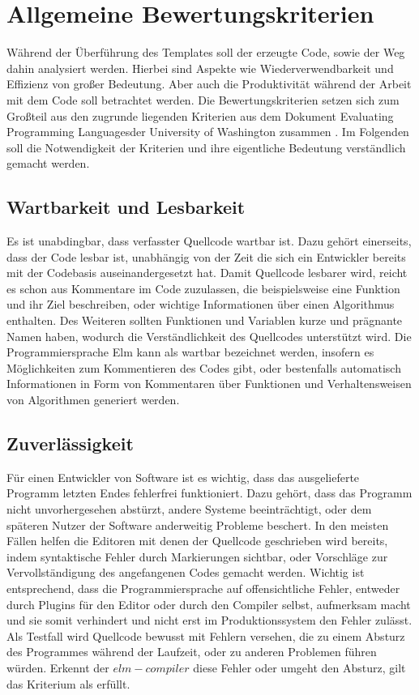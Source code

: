\section{Allgemeine Bewertungskriterien}
\label{sec:Bewertungskriterien}
Während der Überführung des Templates soll der erzeugte Code, sowie der Weg dahin analysiert werden. Hierbei sind Aspekte wie Wiederverwendbarkeit und Effizienz von großer Bedeutung. Aber auch die Produktivität während der Arbeit mit dem Code soll betrachtet werden. Die Bewertungskriterien setzen sich zum Großteil aus den zugrunde liegenden Kriterien aus dem Dokument \glqq Evaluating Programming Languages\grqq der University of Washington zusammen \cite[Vgl.]{washington-evaluation}. Im Folgenden soll die Notwendigkeit der Kriterien und ihre eigentliche Bedeutung verständlich gemacht werden.


\subsection{Wartbarkeit und Lesbarkeit}
\label{sec:muster_wartbarkeit_und_lesbarkeit}
Es ist unabdingbar, dass verfasster Quellcode wartbar ist. Dazu gehört einerseits, dass der Code lesbar ist, unabhängig von der Zeit die sich ein Entwickler bereits mit der Codebasis auseinandergesetzt hat. Damit Quellcode lesbarer wird, reicht es schon aus Kommentare im Code zuzulassen, die beispielsweise eine Funktion und ihr Ziel beschreiben, oder wichtige Informationen über einen Algorithmus enthalten. Des Weiteren sollten Funktionen und Variablen kurze und prägnante Namen haben, wodurch die Verständlichkeit des Quellcodes unterstützt wird. Die Programmiersprache Elm kann als wartbar bezeichnet werden, insofern es Möglichkeiten zum Kommentieren des Codes gibt, oder bestenfalls automatisch Informationen in Form von Kommentaren über Funktionen und Verhaltensweisen von Algorithmen generiert werden.


\subsection{Zuverlässigkeit}
\label{sec:muster_zuverlaessigkeit}
Für einen Entwickler von Software ist es wichtig, dass das ausgelieferte Programm letzten Endes fehlerfrei funktioniert. Dazu gehört, dass das Programm nicht unvorhergesehen abstürzt, andere Systeme beeinträchtigt, oder dem späteren Nutzer der Software anderweitig Probleme beschert. In den meisten Fällen helfen die Editoren mit denen der Quellcode geschrieben wird bereits, indem syntaktische Fehler durch Markierungen sichtbar, oder Vorschläge zur Vervollständigung des angefangenen Codes gemacht werden. Wichtig ist entsprechend, dass die Programmiersprache auf offensichtliche Fehler, entweder durch Plugins für den Editor oder durch den Compiler selbst, aufmerksam macht und sie somit verhindert und nicht erst im Produktionssystem den Fehler zulässt. Als Testfall wird Quellcode bewusst mit Fehlern versehen, die zu einem Absturz des Programmes während der Laufzeit, oder zu anderen Problemen führen würden. Erkennt der $elm-compiler$ diese Fehler oder umgeht den Absturz, gilt das Kriterium als erfüllt.


